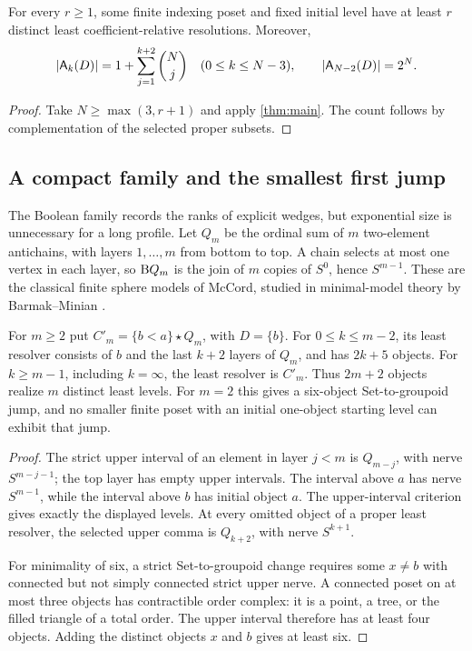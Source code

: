 \begin{corollary}\label{cor:unbounded}
For every $r\geq1$, some finite indexing poset and fixed initial level have
at least $r$ distinct least coefficient-relative resolutions. Moreover,
\begin{equation}\label{eq:size}
|\mathsf A_k(D)|=1+\sum_{j=1}^{k+2}\binom Nj\quad(0\leq k\leq N-3),
\qquad |\mathsf A_{N-2}(D)|=2^N.
\end{equation}
\end{corollary}

\begin{proof}
Take $N\geq\max(3,r+1)$ and apply \cref{thm:main}. The count follows
by complementation of the selected proper subsets.
\end{proof}

\subsection{A compact family and the smallest first jump}
\label{sec:compact}

The Boolean family records the ranks of explicit wedges, but exponential
size is unnecessary for a long profile. Let $Q_m$ be the ordinal sum
of $m$ two-element antichains, with layers $1,\ldots,m$ from bottom
to top. A chain selects at most one vertex in each layer, so
$\mathrm B Q_m$ is the join of $m$ copies of $S^0$, hence $S^{m-1}$.
These are the classical finite sphere models of McCord, studied in
minimal-model theory by Barmak--Minian \cite{BarmakMinimal}.

\begin{proposition}\label{prop:compact}
For $m\geq2$ put $C'_m=\{b<a\}\star Q_m$, with $D=\{b\}$.
For $0\leq k\leq m-2$, its least resolver consists of $b$ and the
last $k+2$ layers of $Q_m$, and has $2k+5$ objects. For
$k\geq m-1$, including $k=\infty$, the least resolver is $C'_m$.
Thus $2m+2$ objects realize $m$ distinct least levels. For $m=2$
this gives a six-object Set-to-groupoid jump, and no smaller finite
poset with an initial one-object starting level can exhibit that jump.
\end{proposition}

\begin{proof}
The strict upper interval of an element in layer $j<m$ is $Q_{m-j}$,
with nerve $S^{m-j-1}$; the top layer has empty upper intervals.
The interval above $a$ has nerve $S^{m-1}$, while the interval above
$b$ has initial object $a$. The upper-interval criterion gives exactly
the displayed levels. At every omitted object of a proper least
resolver, the selected upper comma is $Q_{k+2}$, with nerve $S^{k+1}$.

For minimality of six, a strict Set-to-groupoid change requires some
$x\ne b$ with connected but not simply connected strict upper nerve.
A connected poset on at most three objects has contractible order
complex: it is a point, a tree, or the filled triangle of a total
order. The upper interval therefore has at least four objects.
Adding the distinct objects $x$ and $b$ gives at least six.
\end{proof}

